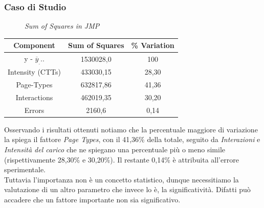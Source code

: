 \subsubsection{Caso di Studio}
\begin{figure}[H]
	\caption{\textit{Sum of Squares in JMP}}
\end{figure}
\begin{table}[h]
	\begin{center}
		\begin{tabular}{|c|c|c|}
			\hline
			Component & Sum of Squares & \% Variation\\
			\hline
			 \rule[-4mm]{0mm}{0.5cm}
			 y - {$\overline{y}_...$}   	& 1530028,0		   & 100\\
			 \rule[-4mm]{0mm}{0.5cm}
			 Intensity (CTTs) 		  & 433030,15		   & 28,30\\
			 \rule[-4mm]{0mm}{0.5cm}
			 Page-Types 		  & 632817,86		   & 41,36\\
			 \rule[-4mm]{0mm}{0.5cm}
			 Interactions		  & 462019,35		   & 30,20\\
			 \rule[-4mm]{0mm}{0.5cm}
			 Errors 		  & 2160,6		   & 0,14\\
			\hline
		\end{tabular}
	\end{center}
\end{table}
Osservando i risultati ottenuti notiamo che la percentuale maggiore di variazione la spiega il fattore \textit{Page Types}, con il 41,36\% della totale, seguito da \textit{Interazioni} e \textit{Intensità del carico} che ne spiegano una percentuale più o meno simile (rispettivamente 28,30\% e 30,20\%). Il restante 0,14\% è attribuita all'errore sperimentale.
\\
Tuttavia l'importanza non è un concetto statistico, dunque necessitiamo la valutazione di un altro parametro che invece lo è, la significatività.
Difatti può accadere che un fattore importante non sia significativo.
